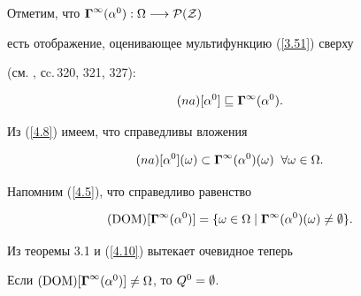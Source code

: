 Отметим, что ${{\boldsymbol\Gamma}^\infty}({\alpha}^0):\Omega \longrightarrow \cal{P}(Z)$


есть отображение, оценивающее мультифункцию (\ref{3.51}) сверху


(см. \cite{55}, сc.\,320, 321, 327):


\begin{equation}\label{4.8}


(na)[{\alpha}^0] \sqsubseteq {{\mG}^\infty}({\alpha}^0).


\end{equation}


Из (\ref{4.8}) имеем, что справедливы вложения


\begin{equation}\label{4.9}


(na)[{\alpha}^0](\omega) \subset


{{\mG}^\infty}({\alpha}^0)(\omega)\;\;\fo{\omega} \in \Om.


\end{equation}


Напомним (\ref{4.5}), что справедливо равенство


\begin{equation}\label{4.10}


(\DOM)[{{\mG}^\infty}({\alpha}^0)] = \{\omega \in \Om \mid


{{\mG}^\infty}({\alpha}^0)(\omega) \ne \emp\}.


\end{equation}


Из теоремы 3.1 и (\ref{4.10}) вытекает очевидное теперь








\begin{props}


Если $(\operatorname{DOM})[{{\boldsymbol\Gamma}^\infty}({\alpha}^0)] \ne \Omega$, то ${Q^0} = \emptyset$.


\end{props}








